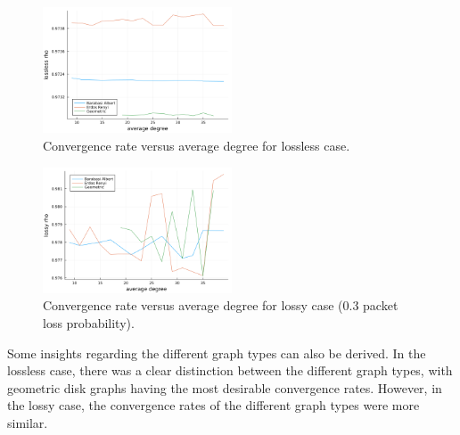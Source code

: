 \documentclass[conference]{IEEEtran}
\begin{document}
\begin {figure}[h]
    \centering
    \includegraphics[width=0.5\textwidth]{mu.png}
    \caption{Convergence rate versus average degree for lossless case.}
    \label{fig:mu_lossless}
\end{figure}

\begin {figure}[h]
    \centering
    \includegraphics[width=0.5\textwidth]{mulossy.png}
    \caption{Convergence rate versus average degree for lossy case (0.3 packet loss probability).}
    \label{fig:mu_lossy}
\end{figure}

Some insights regarding the different graph types can also be derived. In the lossless case, there was 
a clear distinction between the different graph types, with geometric disk graphs having the most desirable 
convergence rates. However, in the lossy case, the convergence rates of the different graph types were more similar.
\end{document}
